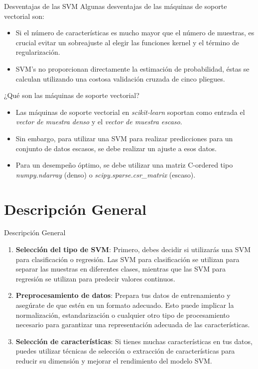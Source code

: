 \documentclass[11pt,aspectratio=169]{beamer}
\begin{document}
\begin{frame}{Desventajas de las SVM}
  Algunas desventajas de las máquinas de soporte vectorial son:\pause
  \begin{itemize}
    \item Si el número de características es mucho mayor que el número de muestras, es crucial evitar un 
      sobreajuste al elegir las funciones kernel y el término de regularización. \pause
    \item SVM's no proporcionan directamente la estimación de probabilidad, éstas se calculan utilizando 
      una costosa validación cruzada de cinco pliegues.
  \end{itemize}
\end{frame}

\begin{frame}{¿Qué son las máquinas de soporte vectorial?}
  \begin{itemize}
    \item Las máquinas de soporte vectorial en \textit{scikit-learn} soportan como entrada el \textit{vector de muestra denso} 
      y el \textit{vector de muestra escaso}. \pause
    \item Sin embargo, para utilizar una SVM para realizar predicciones para un 
      conjunto de datos escasos, se debe realizar un ajuste a esos datos.\pause
    \item Para un desempeño óptimo, se debe utilizar una matriz C-ordered tipo \textit{numpy.ndarray} (denso) o 
      \textit{scipy.sparse.csr\_matrix} (escaso).
  \end{itemize}
\end{frame}

\section{Descripción General}
\begin{frame}{Descripción General}
	\begin{enumerate}
		\item \textbf{Selección del tipo de SVM}: Primero, debes decidir si utilizarás una SVM para clasificación o regresión. 
			Las SVM para clasificación se utilizan para separar las muestras en diferentes clases, mientras que las 
			SVM para regresión se utilizan para predecir valores continuos.\pause
		\item \textbf{Preprocesamiento de datos}: Prepara tus datos de entrenamiento y asegúrate de que estén en un formato 
			adecuado. Esto puede implicar la normalización, estandarización o cualquier otro tipo de procesamiento necesario 
			para garantizar una representación adecuada de las características.\pause
		\item \textbf{Selección de características}: Si tienes muchas características en tus datos, puedes utilizar técnicas de 
			selección o extracción de características para reducir su dimensión y mejorar el rendimiento del modelo SVM. 
	\end{enumerate}
\end{frame}
\end{document}
